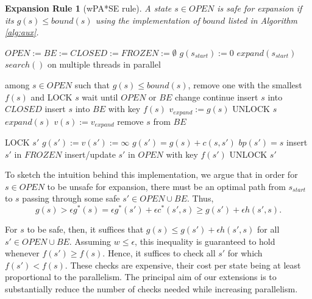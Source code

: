 \documentclass[letterpaper]{article}
\newtheorem{rul}{Expansion Rule}
\begin{document}
\begin{rul}[wPA*SE rule]
A state $s\in OPEN$ is safe for expansion if its $g(s) \le bound(s)$ using the implementation of $bound$ listed in Algorithm \ref{alg:aux}.
\end{rul}

\begin{algorithm}
\caption{$main()$}
\label{alg:main}
\begin{algorithmic}
\STATE $OPEN := BE := CLOSED := FROZEN := \emptyset$
\STATE $g(s_{start}) := 0$
\STATE $expand(s_{start})$
\STATE $search()$ on multiple threads in parallel
\end{algorithmic}
\end{algorithm}

\begin{algorithm}
\caption{$search()$}
\label{alg:search}
\begin{algorithmic}
\STATE among $s\in OPEN$ such that $g(s) \le bound(s)$, remove one with the smallest $f(s)$ and LOCK $s$
\STATE wait until $OPEN$ or $BE$ change
\STATE continue
\ENDIF
\STATE insert $s$ into $CLOSED$
\STATE insert $s$ into $BE$ with key $f(s)$
\STATE $v_{expand} := g(s)$
\STATE UNLOCK $s$
\STATE $expand(s)$
\STATE $v(s) := v_{expand}$
\STATE remove $s$ from $BE$
\ENDWHILE
\end{algorithmic}
\end{algorithm}

\begin{algorithm}
\caption{$expand(s)$}
\label{alg:expand}
\begin{algorithmic}
\STATE LOCK $s'$
\STATE $g(s') := v(s') := \infty$
\ENDIF
{}
\STATE $g(s') = g(s) + c(s,s')$
\STATE $bp(s') = s$
\STATE insert $s'$ in $FROZEN$
\ELSE
\STATE insert/update $s'$ in $OPEN$ with key $f(s')$
\ENDIF
\ENDIF
\STATE UNLOCK $s'$
\ENDFOR
\end{algorithmic}
\end{algorithm}

To sketch the intuition behind this implementation, we argue that in order for $s\in OPEN$ to be unsafe for expansion, there must be an optimal path from $s_{start}$ to $s$ passing through some safe $s'\in OPEN\cup BE$. Thus,
\[g(s) > \epsilon g^*(s) = \epsilon g^*(s') + \epsilon c^*(s',s) \ge g(s') + \epsilon h(s',s).\]

For $s$ to be safe, then, it suffices that $g(s) \le g(s') + \epsilon h(s', s)$ for all $s'\in OPEN\cup BE$. Assuming $w \le \epsilon$, this inequality is guaranteed to hold whenever $f(s') \ge f(s)$. Hence, it suffices to check all $s'$ for which $f(s') < f(s)$. These checks are expensive, their cost per state being at least proportional to the parallelism. The principal aim of our extensions is to substantially reduce the number of checks needed while increasing parallelism.
\end{document}
